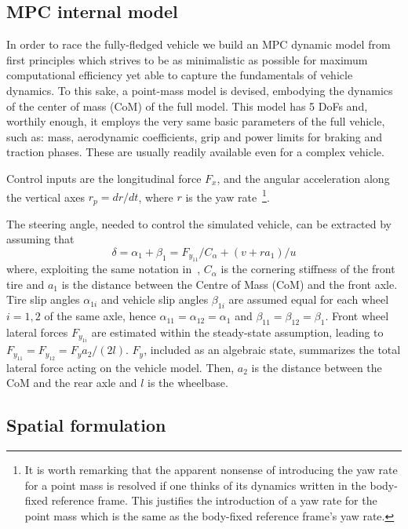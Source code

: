 \documentclass[conference]{IEEEtran} %
\begin{document}
\subsection{MPC internal model}

In order to race the fully-fledged vehicle we build an MPC dynamic model from first principles which strives to be as minimalistic as possible for maximum computational efficiency yet able to capture the fundamentals of vehicle dynamics. To this sake, a point-mass model is devised, embodying the dynamics of the center of mass (CoM) of the full model.
This model has 5 DoFs and, worthily enough, it employs the very same basic parameters of the full vehicle, such as: mass, aerodynamic coefficients, grip and power limits for braking and traction phases. These are usually readily available even for a complex vehicle.

Control inputs are the longitudinal force $F_{x}$, and the angular acceleration along the vertical axes $r_p = dr/dt$, where $r$ is the yaw rate~\footnote{It is worth remarking that the apparent nonsense of introducing the yaw rate for a point mass is resolved if one thinks of its dynamics written in the body-fixed reference frame. This justifies the introduction of a yaw rate for the point mass which is the same as the body-fixed reference frame's yaw rate.}.

The steering angle, needed to control the simulated vehicle, can be extracted by assuming that
\begin{equation}
\delta = \alpha_{1} + \beta_1 = F_{y_{11}}/C_\alpha + (v + ra_1)/u
\end{equation}
where, exploiting the same notation in~\citet{Guiggiani2018}, $C_\alpha$ is the cornering stiffness of the front tire and $a_1$ is the distance between the Centre of Mass (CoM) and the front axle.
Tire slip angles $\alpha_{1i}$ and vehicle slip angles $\beta_{1i}$ are assumed equal for each wheel $i=1, 2$ of the same axle, hence $\alpha_{11} = \alpha_{12} = \alpha_{1}$ and $\beta_{11} = \beta_{12} = \beta_{1}$.
%
Front wheel lateral forces $F_{y_{1i}}$ are estimated within the steady-state assumption, leading to $F_{y_{11}} = F_{y_{12}} = F_{y}a_2/(2l)$.
$F_{y}$, included as an algebraic state, summarizes the total lateral force acting on the vehicle model. Then, $a_2$ is the distance between the CoM and the rear axle and $l$ is the wheelbase.

\subsection{Spatial formulation}
\end{document}
